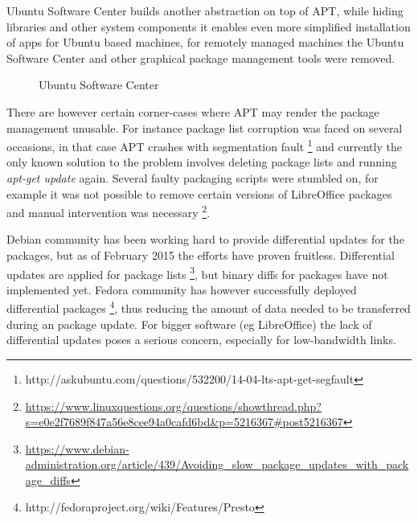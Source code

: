 \documentclass{article}
\begin{document}
Ubuntu Software Center builds another abstraction on top of APT,
while hiding libraries and other system components it enables
even more simplified installation of apps for Ubuntu based
machines, for remotely managed machines the Ubuntu Software Center
and other graphical package management tools were removed.

\begin{figure}[!htb]
\centering
{}
\caption{Ubuntu Software Center}
\label{fig:ubuntu-software-center}
\end{figure}

There are however certain corner-cases where APT may render
the package management unusable.
For instance package list corruption was faced on several occasions,
in that case APT crashes with segmentation fault
\footnote{http://askubuntu.com/questions/532200/14-04-lts-apt-get-segfault}
and currently the only known solution to the problem
involves deleting package lists and running \emph{apt-get update} again.
Several faulty packaging scripts were stumbled on,
for example it was not possible to remove certain versions of LibreOffice packages
and manual intervention was necessary
\footnote{\url{https://www.linuxquestions.org/questions/showthread.php?s=e0e2f7689f847a56e8cee94a0cafd6bd&p=5216367#post5216367}}.

Debian community has been working hard to provide differential updates for
the packages, but as of February 2015 the efforts have proven fruitless.
Differential updates are applied for package lists
\footnote{\url{https://www.debian-administration.org/article/439/Avoiding_slow_package_updates_with_package_diffs}},
but binary diffs for packages have not implemented yet.
Fedora community has however successfully deployed differential packages
\footnote{http://fedoraproject.org/wiki/Features/Presto},
thus reducing the amount of data needed to be transferred during an package update. For bigger software (eg LibreOffice) the lack of differential updates poses a serious concern, especially for low-bandwidth links.
\end{document}
